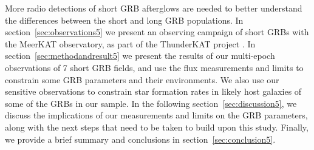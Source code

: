 \documentclass[12pt]{article}
\begin{document}
More radio detections of short GRB afterglows are needed to better understand the differences between the short and long GRB populations. In section~\ref{sec:observations5} we present an observing campaign of short GRBs with the MeerKAT observatory, as part of the ThunderKAT project \citep{2016mks..confE..13F}. In section~\ref{sec:methodandresult5} we present the results of our multi-epoch observations of 7 short GRB fields, and use the flux measurements and limits to constrain some GRB parameters and their environments. We also use our sensitive observations to constrain star formation rates in likely host galaxies of some of the GRBs in our sample. In the following section~\ref{sec:discussion5}, we discuss the implications of our measurements and limits on the GRB parameters, along with the next steps that need to be taken to build upon this study. Finally, we provide a brief summary and conclusions in section~\ref{sec:conclusion5}.
\end{document}
